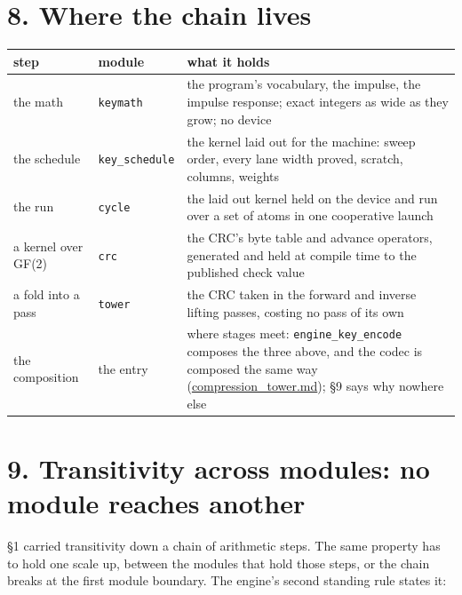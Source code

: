 \section{\texorpdfstring{8. Where the chain lives}{8. Where the chain lives}}

{\small
\setlength{\tabcolsep}{6pt}
\begin{longtable}{>{\RaggedRight\arraybackslash}p{}>{\RaggedRight\arraybackslash}p{}>{\RaggedRight\arraybackslash}p{}}
\toprule
step & module & what it holds \\
\midrule
\endhead
the math & \texttt{keymath} & the program's vocabulary, the impulse, the impulse response; exact integers as wide as they grow; no device \\
the schedule & \texttt{key\_\allowbreak{}schedule} & the kernel laid out for the machine: sweep order, every lane width proved, scratch, columns, weights \\
the run & \texttt{cycle} & the laid out kernel held on the device and run over a set of atoms in one cooperative launch \\
a kernel over GF(2) & \texttt{crc} & the CRC's byte table and advance operators, generated and held at compile time to the published check value \\
a fold into a pass & \texttt{tower} & the CRC taken in the forward and inverse lifting passes, costing no pass of its own \\
the composition & the entry & where stages meet: \texttt{engine\_\allowbreak{}key\_\allowbreak{}encode} composes the three above, and the codec is composed the same way (\hyperref[chap:compression-tower]{compression\_\allowbreak{}tower.md}); §9 says why nowhere else \\
\bottomrule
\end{longtable}
}

\section{\texorpdfstring{9. Transitivity across modules: no module reaches another}{9. Transitivity across modules: no module reaches another}}

§1 carried transitivity down a chain of arithmetic steps. The same property has to hold one scale up, between the modules that hold those steps, or the chain breaks at the first module boundary. The engine's second standing rule states it:

